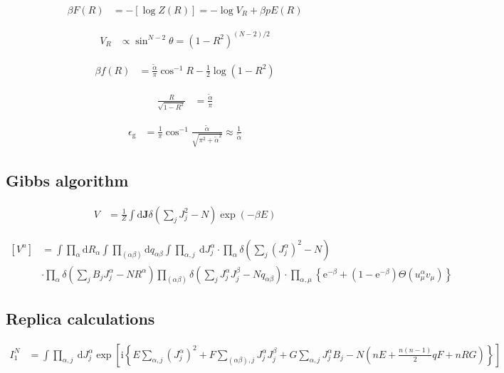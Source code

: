 \documentclass{article}
\begin{document}
\begin{align*}
\beta F(R) &= -[\log Z(R)] = -\log V_{R} + \beta p E(R) \tag{8.24}
\end{align*}

\begin{align*}
V_{R} &\propto \sin^{N-2} \theta = \left(1 - R^{2}\right)^{(N-2)/2} \tag{8.25}
\end{align*}

\begin{align*}
\beta f(R) &= \frac{\tilde{\alpha}}{\pi} \cos^{-1} R - \frac{1}{2} \log \left(1 - R^{2}\right) \tag{8.26}
\end{align*}

\begin{align*}
\frac{R}{\sqrt{1 - R^{2}}} &= \frac{\tilde{\alpha}}{\pi} \tag{8.27}
\end{align*}

\begin{align*}
\epsilon_{\mathrm{g}} &= \frac{1}{\pi} \cos^{-1} \frac{\tilde{\alpha}}{\sqrt{\pi^{2} + \tilde{\alpha}^{2}}} \approx \frac{1}{\tilde{\alpha}} \tag{8.28}
\end{align*}

\subsection{Gibbs algorithm}
\begin{align*}
V &= \frac{1}{Z} \int \mathrm{d} \boldsymbol{J} \delta\left(\sum_{j} J_{j}^{2} - N\right) \exp\left(-\beta E\right) \tag{8.29}
\end{align*}

\begin{align*}
{\left[V^{n}\right]} &= \int \prod_{\alpha} \mathrm{d} R_{\alpha} \int \prod_{(\alpha \beta)} \mathrm{d} q_{\alpha \beta} \int \prod_{\alpha, j} \mathrm{~d} J_{j}^{\alpha} \cdot \prod_{\alpha} \delta\left(\sum_{j}\left(J_{j}^{\alpha}\right)^{2}-N\right) \\ 
&\cdot  \prod_{\alpha} \delta\left(\sum_{j} B_{j} J_{j}^{\alpha}-N R^{\alpha}\right) \prod_{(\alpha \beta)} \delta\left(\sum_{j} J_{j}^{\alpha} J_{j}^{\beta}-N q_{\alpha \beta}\right) \cdot \prod_{\alpha, \mu}\left\{\mathrm{e}^{-\beta} + \left(1-\mathrm{e}^{-\beta}\right) \Theta\left(u_{\mu}^{\alpha} v_{\mu}\right)\right\} \tag{8.30}
\end{align*}

\subsection{Replica calculations}
\begin{align*}
I_{1}^{N} &= \int \prod_{\alpha, j} \mathrm{~d} J_{j}^{\alpha} \exp \left[\mathrm{i} \left\{E \sum_{\alpha, j}\left(J_{j}^{\alpha}\right)^{2} + F \sum_{(\alpha \beta), j} J_{j}^{\alpha} J_{j}^{\beta} + G \sum_{\alpha, j} J_{j}^{\alpha} B_{j} - N \left( n E + \frac{n(n-1)}{2} q F + n R G \right)\right\}\right] \tag{8.31}
\end{align*}
\end{document}
